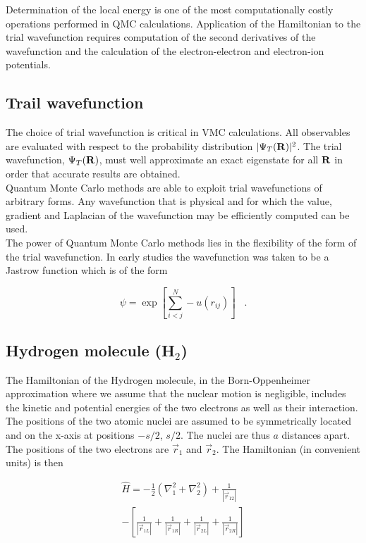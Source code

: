\documentclass{article}
\begin{document}
Determination of the local energy is one of the most computationally costly operations performed in QMC calculations. Application of the Hamiltonian to the trial wavefunction requires computation of the second derivatives of the wavefunction and the calculation of the electron-electron and electron-ion potentials.

\subsection{Trail wavefunction}

The choice of trial wavefunction is critical in VMC calculations. All observables are evaluated with respect to the probability distribution  $\vert\Psi_T({\bf R})\vert^2$. The trial wavefunction,  $\Psi_T({\bf R})$, must well approximate an exact eigenstate for all ${\bf R}$ in order that accurate results are obtained. \\

Quantum Monte Carlo methods are able to exploit trial wavefunctions of arbitrary forms. Any wavefunction that is physical and for which the value, gradient and Laplacian of the wavefunction may be efficiently computed can be used\citep{phd}. \\

The power of Quantum Monte Carlo methods lies in the flexibility of the form of the trial wavefunction. In early studies the wavefunction was taken to be a Jastrow function \citep{jastrow1955many} which is of the form

\begin{equation}
\psi=\exp \left[ \sum_{i<j}^{N} -u(r_{ij}) \right] \;\;\;.
\end{equation}

\subsection{Hydrogen molecule (H$_2$)}

The Hamiltonian of the Hydrogen molecule, in the Born-Oppenheimer approximation where we assume that the nuclear motion is negligible, includes the kinetic and potential energies of the two electrons as well as their interaction. The positions of the two atomic nuclei are assumed to be symmetrically located and on the x-axis at positions $-s/2$, $s/2$. The nuclei are thus $a$ distances apart. The positions of the two electrons are $\vec{r}_1$ and $\vec{r}_2$. The Hamiltonian (in convenient units) is then

\begin{align}
\label{Hamiltonian}
 \hat{H}=-\frac{1}{2}\left( \nabla_1^2 + \nabla_2^2 \right) +\frac{1}{\left| \vec{r}_{12} \right|}  \\ - \left[ \frac{1}{|\vec{r}_{1L}|} +\frac{1}{|\vec{r}_{1R}|}+\frac{1}{|\vec{r}_{2L}|}+\frac{1}{|\vec{r}_{2R}|} \right] 
\end{align}
\end{document}
